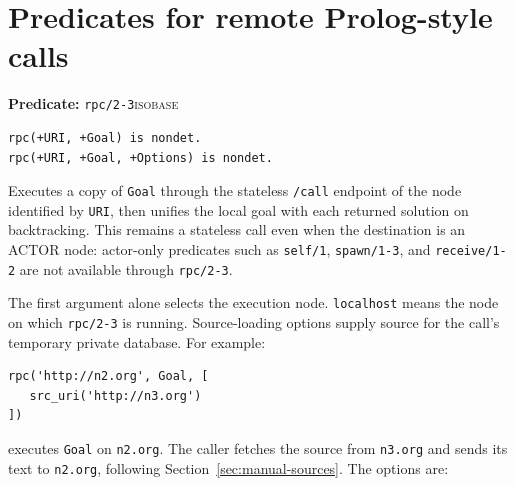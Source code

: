 \section{Predicates for remote Prolog-style calls}\label{sec:synchronous-predicate-api}
\noindent \textbf{Predicate:} \texttt{rpc/\allowbreak{}2-3}\hfill\textsc{isobase}

\begin{verbatim}
rpc(+URI, +Goal) is nondet.
rpc(+URI, +Goal, +Options) is nondet.
\end{verbatim}

\noindent Executes a copy of \texttt{Goal} through the stateless
\texttt{/\allowbreak{}call} endpoint of the node identified by \texttt{URI}, then unifies
the local goal with each returned solution on backtracking. This remains a
stateless call even when the destination is an ACTOR node: actor-only
predicates such as \texttt{self/\allowbreak{}1}, \texttt{spawn/\allowbreak{}1-3}, and
\texttt{receive/\allowbreak{}1-2} are not available through \texttt{rpc/\allowbreak{}2-3}.

The first argument alone selects the execution node. \texttt{localhost} means
the node on which \texttt{rpc/\allowbreak{}2-3} is running. Source-loading options supply
source for the call's temporary private database. For example:
\begin{verbatim}
rpc('http://n2.org', Goal, [
   src_uri('http://n3.org')
])
\end{verbatim}
executes \texttt{Goal} on \texttt{n2.org}. The caller fetches the source from
\texttt{n3.org} and sends its text to \texttt{n2.org}, following
Section~\ref{sec:manual-sources}. The options are:


